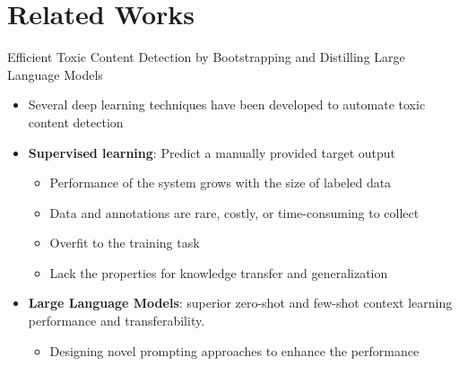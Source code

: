 \section{Related Works}


\begin{frame}{Efficient Toxic Content Detection by Bootstrapping and Distilling Large Language Models}

\begin{itemize}

    \item Several deep learning techniques have been developed to automate toxic content detection 

     \item \textbf{Supervised learning}: Predict a manually provided target output
        \begin{itemize}
            \item Performance of the system grows with the size of labeled data 
            \item Data and annotations are rare, costly, or time-consuming to collect
            \item Overfit to the training task
            \item  Lack the properties for knowledge transfer and generalization
        \end{itemize}

    \item \textbf{Large Language Models}: superior zero-shot and few-shot context learning performance and transferability.
    \begin{itemize}
        \item Designing novel prompting approaches to enhance the performance
    \end{itemize}

\end{itemize}

\end{frame}


